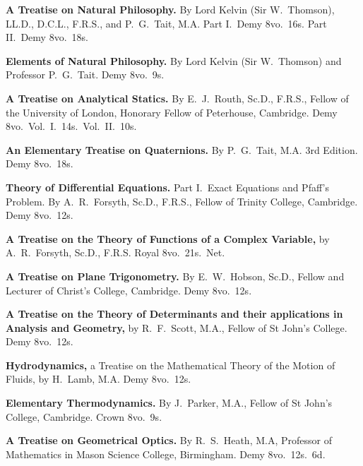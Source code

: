 \documentclass[11pt,a4paper]{article}
\theoremstyle{plain}
\theoremstyle{definition}
\theoremstyle{remark}
\begin{document}
\smallskip

\noindent\textbf{A Treatise on Natural Philosophy.} By Lord Kelvin (Sir W.\ Thomson), LL.D., D.C.L., F.R.S., and P.\ G.\ Tait, M.A. Part I.\ Demy 8vo.\ 16s. Part II.\ Demy 8vo.\ 18s.

\smallskip

\noindent\textbf{Elements of Natural Philosophy.} By Lord Kelvin (Sir W.\ Thomson) and Professor P.\ G.\ Tait. Demy 8vo.\ 9s.

\smallskip

\noindent\textbf{A Treatise on Analytical Statics.} By E.\ J.\ Routh, Sc.D., F.R.S., Fellow of the University of London, Honorary Fellow of Peterhouse, Cambridge. Demy 8vo.\ Vol.\ I.\ 14s.\ Vol.\ II.\ 10s.

\smallskip

\noindent\textbf{An Elementary Treatise on Quaternions.} By P.\ G.\ Tait, M.A. 3rd Edition. Demy 8vo.\ 18s.

\smallskip

\noindent\textbf{Theory of Differential Equations.} Part I.\ Exact Equations and Pfaff's Problem. By A.\ R.\ Forsyth, Sc.D., F.R.S., Fellow of Trinity College, Cambridge. Demy 8vo.\ 12s.

\smallskip

\noindent\textbf{A Treatise on the Theory of Functions of a Complex Variable,} by A.\ R.\ Forsyth, Sc.D., F.R.S. Royal 8vo.\ 21s.\ Net.

\smallskip

\noindent\textbf{A Treatise on Plane Trigonometry.} By E.\ W.\ Hobson, Sc.D., Fellow and Lecturer of Christ's College, Cambridge. Demy 8vo.\ 12s.

\smallskip

\noindent\textbf{A Treatise on the Theory of Determinants and their applications in Analysis and Geometry,} by R.\ F.\ Scott, M.A., Fellow of St John's College. Demy 8vo.\ 12s.

\smallskip

\noindent\textbf{Hydrodynamics,} a Treatise on the Mathematical Theory of the Motion of Fluids, by H.\ Lamb, M.A. Demy 8vo.\ 12s.

\smallskip

\noindent\textbf{Elementary Thermodynamics.} By J.\ Parker, M.A., Fellow of St John's College, Cambridge. Crown 8vo.\ 9s.

\smallskip

\noindent\textbf{A Treatise on Geometrical Optics.} By R.\ S.\ Heath, M.A, Professor of Mathematics in Mason Science College, Birmingham. Demy 8vo.\ 12s.\ 6d.
\end{document}
